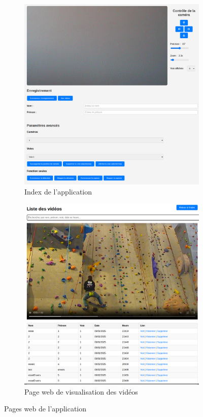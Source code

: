 \documentclass[a4paper, 11pt, french]{article}
\begin{document}
\begin{figure}
  \centering
  \begin{subfigure}[b]{0.45\textwidth}
    \includegraphics[width=\textwidth]{pageIndex.png}
    \caption{Index de l'application}
    \label{fig:pageIndex}
  \end{subfigure}
  \begin{subfigure}[b]{0.45\textwidth}
    \includegraphics[width=\textwidth]{pageVideo.png}
    \caption{Page web de visualisation des vidéos}
    \label{fig:pageVideo}
  \end{subfigure}
  \caption{Pages web de l'application}
  \label{fig:pagesWeb}
\end{figure}
\end{document}
